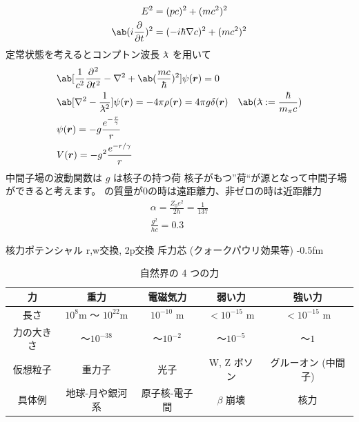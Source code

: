 \documentclass[uplatex,dvipdfmx,a4paper,11pt]{jlreq}
\newcommand{\rr}{\bm{r}}
\newcommand{\lbar}{\lambda \kern -0.5em\raise 0.5ex \hbox{--}}
\numberwithin{equation}{section}
\theoremstyle{definition}
\begin{document}
\begin{align}
  E^2                 & = (pc)^2 + (mc^2)^2              \\
  \ab(i\diffp{}{t})^2 & = (-i\hbar\nabla c)^2 + (mc^2)^2
\end{align}
定常状態を考えるとコンプトン波長 $\lbar$ を用いて
\begin{align}
   & \ab[\frac{1}{c^2}\diffp[2]{}{t} - \nabla^2 + \ab(\frac{mc}{\hbar})^2]\psi(\rr) = 0                                       \\
   & \ab[\nabla^2 - \frac{1}{\lbar^2}]\psi(\rr) = -4\pi\rho(\rr) = 4\pi g\delta(\rr)    & \ab(\lbar := \frac{\hbar}{m_\pi c}) \\
   & \psi(\rr) = -g\frac{e^{-\frac{r}{\gamma}}}{r}                                                                            \\
   & V(\rr) = -g^2\frac{e^{-r/\gamma}}{r}
\end{align}
中間子場の波動関数は $g$ は核子の持つ荷
核⼦がもつ”荷“が源となって中間⼦場ができると考えます。
の質量が0の時は遠距離⼒、⾮ゼロの時は近距離⼒
\begin{align}
  \alpha = \frac{Z_0 e^2}{2h} = \frac{1}{137} \\
  \frac{g^2}{hc} = 0.3
\end{align}

核⼒ポテンシャル
r,w交換, 2p交換
斥力芯 (クォークパウリ効果等) -0.5fm

\begin{table}[hbtp]
  \centering
  \begin{tabular}{|c|c|c|c|c|}
    \hline
    力     & 重力                             & 電磁気力              & 弱い力                & 強い力                \\
    \hline \hline
    長さ    & $10^8$\si{m} ～ $10^{22}$\si{m} & $10^{-10}$ \si{m} & $<10^{-15}$ \si{m} & $<10^{-15}$ \si{m} \\
    力の大きさ & ～$10^{-38}$                    & ～$10^{-2}$        & ～$10^{-5}$         & ～$1$               \\
    仮想粒子  & 重力子                            & 光子                & W, Z ボソン           & グルーオン (中間子)        \\
    具体例   & 地球-月や銀河系                       & 原子核-電子間           & $\beta$ 崩壊         & 核力                 \\
    \hline
  \end{tabular}
  \caption{自然界の 4 つの力}
  \label{table:force}
\end{table}
\end{document}
